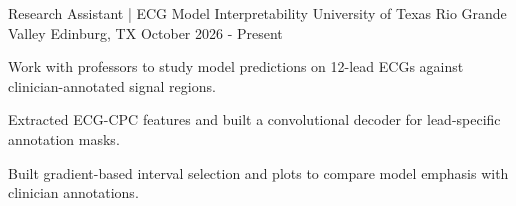 

\begin{cventries}


  \cventry
    {Research Assistant | ECG Model Interpretability} %
    {University of Texas Rio Grande Valley} %
    {Edinburg, TX} %
    {October 2026 - Present} %
    {
      \begin{cvitems}
        \item {Work with professors to study model predictions on 12-lead ECGs against clinician-annotated signal regions.}
        \item {Extracted ECG-CPC features and built a convolutional decoder for lead-specific annotation masks.}
        \item {Built gradient-based interval selection and plots to compare model emphasis with clinician annotations.}
      \end{cvitems}
    }


\end{cventries}
